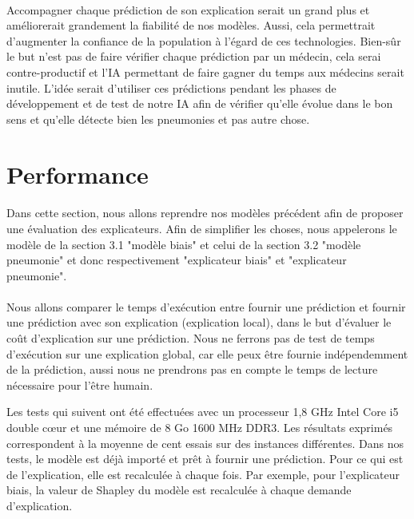 \paragraph{}Accompagner chaque prédiction de son explication serait un grand plus et améliorerait grandement la fiabilité de nos modèles. Aussi, cela permettrait d'augmenter la confiance de la population à l'égard de ces technologies. Bien-sûr le but n'est pas de faire vérifier chaque prédiction par un médecin, cela serai contre-productif et l'IA permettant de faire gagner du temps aux médecins serait inutile. L'idée serait d'utiliser ces prédictions pendant les phases de développement et de test de notre IA afin de vérifier qu'elle évolue dans le bon sens et qu'elle détecte bien les pneumonies et pas autre chose.

\section{Performance}
\paragraph{}Dans cette section, nous allons reprendre nos modèles précédent afin de proposer une évaluation des explicateurs. Afin de simplifier les choses, nous appelerons le modèle de la section 3.1 "modèle biais" et celui de la section 3.2 "modèle pneumonie" et donc respectivement "explicateur biais" et "explicateur pneumonie".

\paragraph{}Nous allons comparer le temps d'exécution entre fournir une prédiction et fournir une prédiction avec son explication (explication local), dans le but d'évaluer le coût d'explication sur une prédiction. Nous ne ferrons pas de test de temps d'exécution sur une explication global, car elle peux être fournie indépendemment de la prédiction, aussi nous ne prendrons pas en compte le temps de lecture nécessaire pour l'être humain.\par
Les tests qui suivent ont été effectuées avec un processeur 1,8 GHz Intel Core i5 double cœur et une mémoire de 8 Go 1600 MHz DDR3. Les résultats exprimés correspondent à la moyenne de cent essais sur des instances différentes. Dans nos tests, le modèle est déjà importé et prêt à fournir une prédiction. Pour ce qui est de l'explication, elle est recalculée à chaque fois. Par exemple, pour l'explicateur biais, la valeur de Shapley du modèle est recalculée à chaque demande d'explication.

